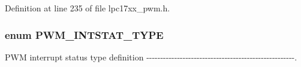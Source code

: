 \-Definition at line 235 of file lpc17xx\-\_\-pwm.\-h.

\hypertarget{group___p_w_m___public___types_gae5985cfa9a69d6264bfa34769709693a}{
\subsubsection[{\-P\-W\-M\-\_\-\-I\-N\-T\-S\-T\-A\-T\-\_\-\-T\-Y\-P\-E}]{\setlength{\rightskip}{0pt plus 5cm}enum {\bf \-P\-W\-M\-\_\-\-I\-N\-T\-S\-T\-A\-T\-\_\-\-T\-Y\-P\-E}}}\label{group___p_w_m___public___types_gae5985cfa9a69d6264bfa34769709693a}


\-P\-W\-M interrupt status type definition -\/-\/-\/-\/-\/-\/-\/-\/-\/-\/-\/-\/-\/-\/-\/-\/-\/-\/-\/-\/-\/-\/-\/-\/-\/-\/-\/-\/-\/-\/-\/-\/-\/-\/-\/-\/-\/-\/-\/-\/-\/-\/-\/-\/-\/-\/-\/-\/-\/-\/-\/-\/-\/. 

